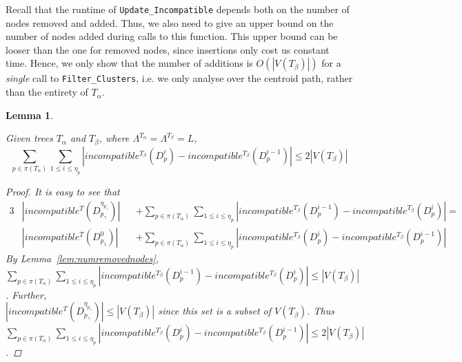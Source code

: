\documentclass{article}
\newcommand{\leafset}{\Lambda}
\newcommand{\TA}{T_\alpha}
\newcommand{\TB}{T_\beta}
\newtheorem{numaddednodes}[incompatibility]{Lemma}
\begin{document}
    Recall that the runtime of \texttt{Update\_Incompatible} depends both on the number of nodes removed and added. Thus, we also need to give an upper bound on the number of nodes added during calls to this function. This upper bound can be looser than the one for removed nodes, since insertions only cost us constant time. Hence, we only show that the number of additions is $O(|V(\TB)|)$ for a \textit{single} call to \texttt{Filter\_Clusters}, i.e. we only analyse over the centroid path, rather than the entirety of $\TA$.
    \newline

    \begin{numaddednodes}
        \label{lem:numaddednodes}

        Given trees $\TA$ and $\TB$, where $\leafset^{\TA} = \leafset^{\TB} = L$, \[\sum_{p \in \pi(\TA)} \sum_{1 \leq i \leq \eta_p} |incompatible^{\TB}(D_p^i) - incompatible^{\TB}(D_p^{i-1})| \leq 2|V(\TB)|\]

        \begin{proof}
            It is easy to see that
            \begin{alignat*}{3}
                &|incompatible^{T}(D_{p_{\gamma}}^{\eta_{p_{\gamma}}})| &&+ \sum_{p \in \pi(\TA)} \sum_{1 \leq i \leq \eta_p} |incompatible^{\TB}(D_p^{i-1}) - incompatible^{\TB}(D_p^i)| =\\
                &|incompatible^{T}(D_{p_1}^{0})| &&+ \sum_{p \in \pi(\TA)} \sum_{1 \leq i \leq \eta_p} |incompatible^{\TB}(D_p^i) - incompatible^{\TB}(D_p^{i-1})|
            \end{alignat*}
            By Lemma~\ref{lem:numremovednodes}, $\sum_{p \in \pi(\TA)} \sum_{1 \leq i \leq \eta_p} |incompatible^{\TB}(D_p^{i-1}) - incompatible^{\TB}(D_p^i)| \leq |V(\TB)|$. Further,\\ $|incompatible^{T}(D_{p_{\gamma}}^{\eta_{p_{\gamma}}})| \leq |V(\TB)|$ since this set is a subset of $V(\TB)$. Thus $\sum_{p \in \pi(\TA)} \sum_{1 \leq i \leq \eta_p} |incompatible^{\TB}(D_p^i) - incompatible^{\TB}(D_p^{i-1})| \leq 2|V(\TB)|$.
        \end{proof}
    \end{numaddednodes}
\end{document}

